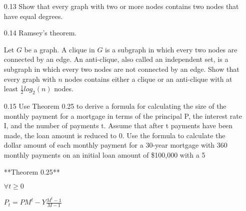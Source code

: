 \documentclass[12pt, a4paper]{article}
\begin{document}
\begin{enumerate}
\item[0.13]
Show that every graph with two or more nodes contains two nodes that have equal degrees.

\item[0.14]
Ramsey's theorem. 

Let $G$ be a graph. A clique in $G$ is a subgraph in which every two nodes are connected by an edge. An anti-clique, also called an independent set, is a subgraph in which every two nodes are not connected by an edge. Show that every graph with $n$ nodes contains either a clique or an anti-clique with at least $\frac{1}{2} log_2(n)$ nodes.


\item[0.15]
Use Theorem 0.25 to derive a formula for calculating the size of the monthly payment for a mortgage in terms of the principal P, the interest rate I, and the number of payments t. Assume that after t payments have been made, the loan amount is reduced to 0. Use the formula to calculate the dollar amount of each monthly payment for a 30-year mortgage with 360 monthly payments on an initial loan amount of \$100,000 with a 5%


**Theorem 0.25**

$\forall t \geq 0$


$P_t=PM^t-Y\frac{M^t-1}{M-1}$
\end{enumerate}
\end{document}
